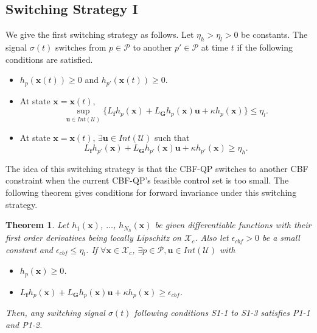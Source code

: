\documentclass[letterpaper, 10 pt, conference]{ieeeconf}  %
\newtheorem{theorem}{Theorem}
\begin{document}
\subsection{Switching Strategy I}
\label{sec:switching_policy_i}
We give the first switching strategy as follows. Let $\eta_h > \eta_l >0$ be constants. The signal $\sigma(t)$ switches from $p\in\mathcal{P}$ to another $p'\in\mathcal{P}$ at time $t$ if the following conditions are satisfied.
\begin{itemize}
     \item[\textbf{S1-1}] $h_p(\mathbf{x}(t))\geq 0$ and $h_{p'}(\mathbf{x}(t))\geq 0$.
     \item[\textbf{S1-2}] At state $\mathbf{x}=\mathbf{x}(t)$,
     \begin{equation*}
         \sup_{\mathbf{u}\in Int(\mathcal{U})}\{L_\mathbf{f}h_p(\mathbf{x}) + L_{\mathbf{G}}h_p(\mathbf{x})\mathbf{u}+\kappa h_p(\mathbf{x})\}\leq \eta_l.
     \end{equation*}
     \item[\textbf{S1-3}] At state $\mathbf{x}=\mathbf{x}(t)$, $\exists \mathbf{u}\in Int(\mathcal{U})$ such that
     \begin{equation*}
         L_\mathbf{f}h_{p'}(\mathbf{x}) + L_{\mathbf{G}}h_{p'}(\mathbf{x})\mathbf{u}+\kappa h_{p'}(\mathbf{x}) \geq \eta_h.
     \end{equation*}
\end{itemize}
{The idea of this switching strategy is that the CBF-QP switches to another CBF constraint when the current CBF-QP's feasible control set is too small.} The following theorem gives conditions for forward invariance under this switching strategy.
 
\begin{theorem}
\label{thm:union-CBF-switching 1}
     Let $h_1(\mathbf{x})$, $\dots$, $h_{N_h}(\mathbf{x})$ be given differentiable functions with their first order derivatives being locally Lipschitz on $\mathcal{X}_c$. {Also let $\epsilon_{cbf}>0$ be a small constant and $\epsilon_{cbf}\leq \eta_l$.} If $\forall \mathbf{x}\in\mathcal{X}_c$, $\exists p\in\mathcal{P}, \mathbf{u}\in Int(\mathcal{U})$ with 
     \begin{itemize}
         \item[\textbf{C1-1}] $h_p(\mathbf{x})\geq 0$.
         \item[\textbf{C1-2}] $L_\mathbf{f}h_p(\mathbf{x}) + L_{\mathbf{G}}h_p(\mathbf{x})\mathbf{u}+\kappa h_p(\mathbf{x}) \geq \epsilon_{cbf}$.
     \end{itemize}
    Then, any switching signal $\sigma(t)$ following conditions S1-1 to S1-3 satisfies P1-1 and P1-2.
\end{theorem}
\end{document}
